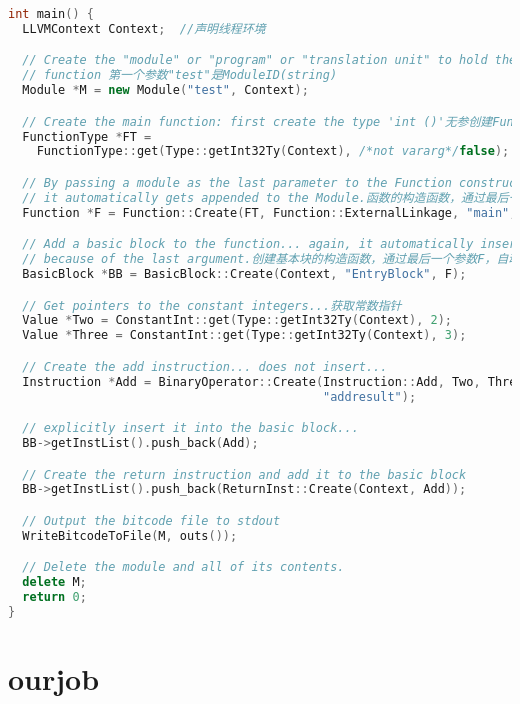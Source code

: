 \documentclass{ctexart}
\begin{document}
\begin{lstlisting}[language=C++]
int main() {
  LLVMContext Context;	//声明线程环境

  // Create the "module" or "program" or "translation unit" to hold the
  // function 第一个参数"test"是ModuleID(string)
  Module *M = new Module("test", Context);

  // Create the main function: first create the type 'int ()'无参创建FunctionType，第一个参数为结果类型(Type× Result)，第二个参数为是否变量参数(bool isVarArg)
  FunctionType *FT =
    FunctionType::get(Type::getInt32Ty(Context), /*not vararg*/false);

  // By passing a module as the last parameter to the Function constructor,
  // it automatically gets appended to the Module.函数的构造函数，通过最后一个参数M，将函数添加到模块里面。
  Function *F = Function::Create(FT, Function::ExternalLinkage, "main", M);

  // Add a basic block to the function... again, it automatically inserts
  // because of the last argument.创建基本块的构造函数，通过最后一个参数F，自动添加到Function中
  BasicBlock *BB = BasicBlock::Create(Context, "EntryBlock", F);

  // Get pointers to the constant integers...获取常数指针
  Value *Two = ConstantInt::get(Type::getInt32Ty(Context), 2);
  Value *Three = ConstantInt::get(Type::getInt32Ty(Context), 3);

  // Create the add instruction... does not insert...
  Instruction *Add = BinaryOperator::Create(Instruction::Add, Two, Three,
                                            "addresult");

  // explicitly insert it into the basic block...
  BB->getInstList().push_back(Add);

  // Create the return instruction and add it to the basic block
  BB->getInstList().push_back(ReturnInst::Create(Context, Add));

  // Output the bitcode file to stdout
  WriteBitcodeToFile(M, outs());

  // Delete the module and all of its contents.
  delete M;
  return 0;
}
\end{lstlisting}


\section{ourjob}
\end{document}

